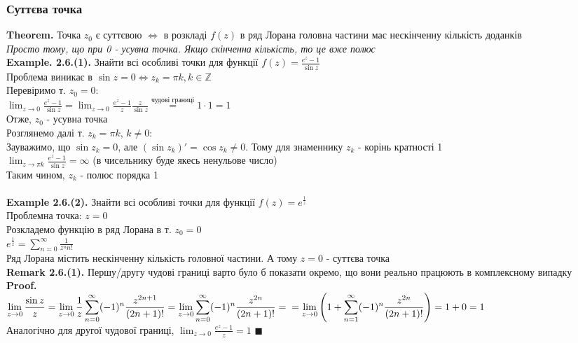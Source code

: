 \documentclass[a4paper, 14pt]{extarticle}
\def\hugespace{\vspace{5mm} \\}
\begin{document}
\subsubsection{Суттєва точка}
\textbf{Theorem.} Точка $z_0$ є суттєвою $\iff$ в розкладі $f(z)$ в ряд Лорана головна частини має нескінченну кількість доданків\\
\textit{Просто тому, що при 0 - усувна точка. Якщо скінченна кількість, то це вже полюс}
\hugespace
\textbf{Example. 2.6.(1).} Знайти всі особливі точки для функції $\displaystyle f(z) = \frac{e^z-1}{\sin z}$\\
Проблема виникає в $\sin z = 0 \iff z_k = \pi k, k \in \mathbb{Z}$\\
Перевіримо т. $z_0 = 0$:\\
$\displaystyle \lim_{z \to 0} \frac{e^z-1}{\sin z} = \lim_{z \to 0} \frac{e^z-1}{z} \frac{z}{\sin z} \overset{\textrm{чудові границі}}{=} 1 \cdot 1 = 1$\\
Отже, $z_0$ - усувна точка\\
Розглянемо далі т. $z_{k} = \pi k$, $k \neq 0$:\\
Зауважимо, що $\sin z_k = 0$, але $(\sin z_k)' = \cos z_k \neq 0$. Тому для знаменнику $z_k$ - корінь кратності 1\\
$\displaystyle \lim_{z \to \pi k} \frac{e^z-1}{\sin z} = \infty$ (в чисельнику буде якесь ненульове число)\\
Таким чином, $z_k$ - полюс порядка 1\\
\hugespace
\textbf{Example 2.6.(2).} Знайти всі особливі точки для функції $\displaystyle f(z) = e^{\textstyle \frac{1}{z}}$\\
Проблемна точка: $z = 0$\\
Розкладемо функцію в ряд Лорана в т. $z_0 = 0$\\
$\displaystyle e^{\textstyle \frac{1}{z}} = \sum_{n=0}^{\infty} \frac{1}{z^n n!}$\\
Ряд Лорана містить нескінченну кількість головної частини. А тому $z = 0$ - суттєва точка
\hugespace
\textbf{Remark 2.6.(1).} Першу/другу чудові границі варто було б показати окремо, що вони реально працюють в комплексному випадку\\
\textbf{Proof.}\\
$\displaystyle \lim_{z \to 0} \frac{\sin z}{z} = \lim_{z \to 0} \frac{1}{z} \sum_{n=0}^{\infty} (-1)^n \frac{z^{2n+1}}{(2n+1)!} = \lim_{z \to 0} \sum_{n=0}^{\infty} (-1)^n \frac{z^{2n}}{(2n+1)!} = \\ = \lim_{z \to 0} \left(1 + \sum_{n=1}^{\infty} (-1)^n \frac{z^{2n}}{(2n+1)!}\right) = 1 + 0 = 1$\\
Аналогічно для другої чудової границі, $\displaystyle \lim_{z \to 0} \frac{e^z - 1}{z} = 1$ $\blacksquare$
\hugespace
\end{document}
